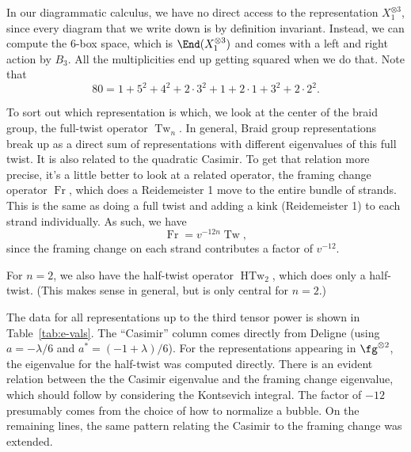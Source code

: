 \documentclass[12pt]{amsart}
\DeclareMathOperator{\Tw}{Tw}
\DeclareMathOperator{\HTw}{HTw}
\DeclareMathOperator{\Fr}{Fr}
\begin{document}
In our diagrammatic calculus, we have no direct access to the
representation $X_1^{\otimes 3}$, since every diagram that we write
down is by definition invariant. Instead, we can compute the 6-box
space, which is $\End(X_1^{\otimes 3})$ and comes with a left and
right action by $B_3$. All the multiplicities end up getting squared
when we do that. Note that
\[
80 = 1 + 5^2 + 4^2 + 2\cdot 3^2 + 1 + 2\cdot 1 + 3^2 + 2\cdot 2^2.
\]

To sort out which representation is which, we look at the center of
the braid group, the full-twist operator $\Tw_n$. In general, Braid
group representations break up as a direct sum of representations with
different eigenvalues of this full twist. It is also related to the
quadratic Casimir. To get that relation more precise, it's a little
better to look at a related operator, the framing change operator
$\Fr$, which does a Reidemeister 1 move to the entire bundle of
strands. This is the same as doing a full twist and adding a kink
(Reidemeister 1) to each strand individually. As such, we have
\[
\Fr = v^{-12n} \Tw,
\]
since the framing change on each strand contributes a factor of
$v^{-12}$.

For $n=2$, we also have the half-twist operator $\HTw_2$, which does
only a half-twist. (This makes sense in general, but is only central
for $n=2$.)

The data for all representations up to the third tensor power is shown
in Table~\ref{tab:e-vals}. The ``Casimir'' column comes directly from
Deligne (using $a = -\lambda/6$ and $a^* = (-1+\lambda)/6$). For the
representations appearing in $\fg^{\otimes 2}$, the eigenvalue for the
half-twist was computed directly. There is an evident relation between
the the Casimir eigenvalue and the framing change eigenvalue, which
should follow by considering the Kontsevich integral. The factor of
$-12$ presumably comes from the choice of how to normalize a
bubble. On the remaining lines, the same pattern relating the Casimir
to the framing change was extended.
\end{document}
